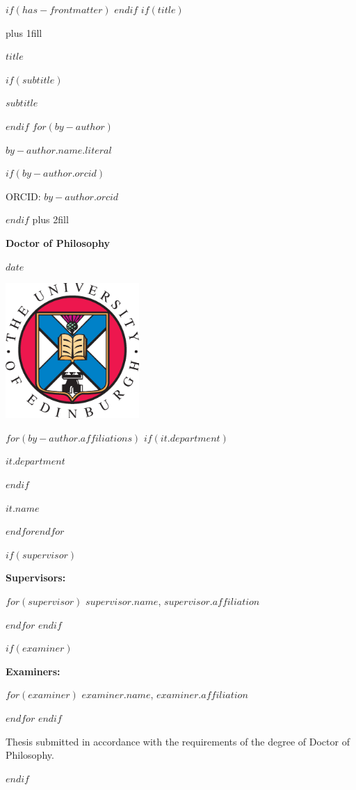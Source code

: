 $if(has-frontmatter)$
\frontmatter
$endif$
$if(title)$
\cleardoublepage
\thispagestyle{empty}
{\centering
\hbox{}\vskip 0cm plus 1fill
{\Huge\bfseries $title$ \par}
$if(subtitle)$
\vspace{3ex}
{\large\bfseries $subtitle$ \par}
$endif$
\vspace{10ex}
$for(by-author)$
{\Large\bfseries $by-author.name.literal$ \par}
$if(by-author.orcid)$
{\large ORCID: $by-author.orcid$ \par}
$endif$
\vskip 0cm plus 2fill
{\bfseries\large Doctor of Philosophy \par}
\vspace{3ex}
{\bfseries\large $date$ \par}
\vspace{5ex}

\centering%
\includegraphics[width=2in]{EdUniCrest.eps}\par%
\vspace{5ex}

$for(by-author.affiliations)$%
$if(it.department)$%
{\bfseries\large $it.department$ \par}
\vspace{3ex}
$endif$%
{\bfseries\large $it.name$ \par}
$endfor$$endfor$%
}
\newpage

\null
\vfill

\flushleft


$if(supervisor)$
{\small\bfseries Supervisors: \par}
$for(supervisor)$
{\small $supervisor.name$, $supervisor.affiliation$}\par
$endfor$
$endif$
\vspace{10ex}

$if(examiner)$
{\small\bfseries Examiners: \par}
$for(examiner)$
{\small $examiner.name$, $examiner.affiliation$}\par
$endfor$
$endif$

\vspace{10ex}
{\small Thesis submitted in accordance with the requirements of the degree of Doctor of Philosophy. \par}

$endif$

\let\mainmatterreal\mainmatter
\let\mainmatter\relax